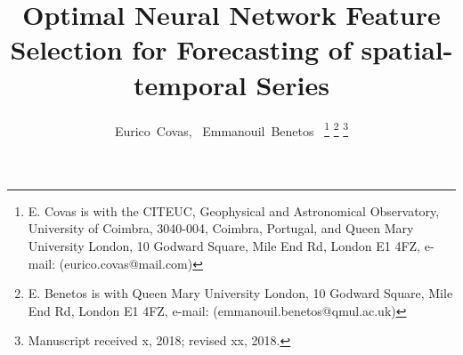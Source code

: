 \documentclass[journal]{IEEEtran}
\begin{document}
%
\title{Optimal Neural Network Feature Selection for Forecasting of spatial-temporal Series}
%
%
%



\author{Eurico~Covas,~\IEEEmembership{}
	    Emmanouil~Benetos~\IEEEmembership{}%
\thanks{E. Covas is with the CITEUC, Geophysical and Astronomical Observatory, University of Coimbra, 3040-004, Coimbra, Portugal, and
Queen Mary University London, 10 Godward Square, Mile End Rd, London E1 4FZ,  e-mail: (eurico.covas@mail.com)}%
\thanks{E. Benetos is with Queen Mary University London, 10 Godward Square, Mile End Rd, London E1 4FZ,
e-mail: (emmanouil.benetos@qmul.ac.uk)}%
\thanks{Manuscript received x, 2018; revised xx, 2018.}}

%
%
\end{document}
